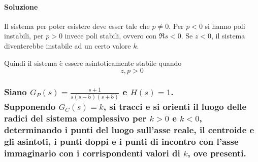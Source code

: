 \paragraph{Soluzione}
Il sistema per poter esistere deve esser tale che \(p\neq0\).
Per \(p<0\) si hanno poli instabili, per \(p>0\) invece poli stabili, ovvero con
\(\Re s<0\).
Se \(z<0\), il sistema diventerebbe instabile ad un certo valore \(k\).

Quindi il sistema è essere asintoticamente stabile quando
\[
	z,p > 0
\]

\begin{center}\end{center}

\subsubsection{
Siano \(\displaystyle G_P(s) = \frac{s+1}{s(s-5)(s+5)}\) e \(H(s) = 1\). \\
Supponendo \(G_C(s)=k\), si tracci e si orienti il luogo delle radici del sistema complessivo per \(k>0\) e \(k<0\), determinando i punti del luogo sull'asse reale, il centroide e gli asintoti, i punti doppi e i punti di incontro con l'asse immaginario con i corrispondenti valori di \(k\), ove presenti.
}

